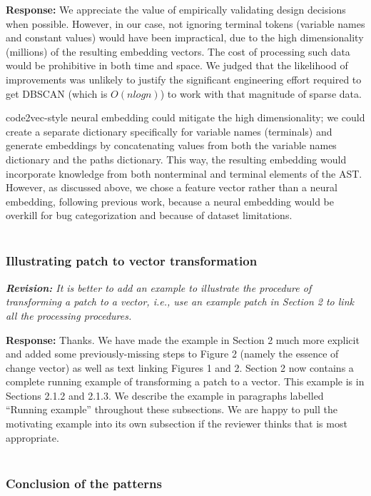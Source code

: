 \documentclass{article}
\begin{document}
\textbf{Response:} We appreciate the value of empirically validating design decisions when possible. However, in our case, not ignoring terminal tokens (variable names and constant values) would have been impractical, due to the high dimensionality (millions) of the resulting embedding vectors. The cost of processing such data would be prohibitive in both time and space. We judged that the likelihood of improvements was unlikely to justify the significant engineering effort required to get DBSCAN (which is $O(nlogn)$) to work with that magnitude of sparse data.

code2vec-style neural embedding could mitigate the high dimensionality; we could create a separate dictionary specifically for variable names (terminals) and generate embeddings by concatenating values from both the variable names dictionary and the paths dictionary. This way, the resulting embedding would incorporate knowledge from both nonterminal and terminal elements of the AST. However, as discussed above, we chose a feature vector rather than a neural embedding, following previous work, because a neural embedding would be overkill for bug categorization and because of dataset limitations. \\ \\

\subsubsection{\label{rev:1:patch}Illustrating patch to vector transformation}

\textit{\textbf{Revision:} It is better to add an example to illustrate the procedure of transforming a patch to a vector, i.e., use an example patch in Section 2 to link all the processing procedures.}

\textbf{Response:} Thanks. We have made the example in Section 2 much more explicit and added some previously-missing steps to Figure 2 (namely the essence of change vector) as well as text linking Figures 1 and 2. Section 2 now contains a complete running example of transforming a patch to a vector. This example is in Sections 2.1.2 and 2.1.3. We describe the example in paragraphs labelled “Running example” throughout these subsections. We are happy to pull the motivating example into its own subsection if the reviewer thinks that is most appropriate. \\ \\

\subsubsection{\label{rev:1:conclusion}Conclusion of the patterns}
\end{document}
